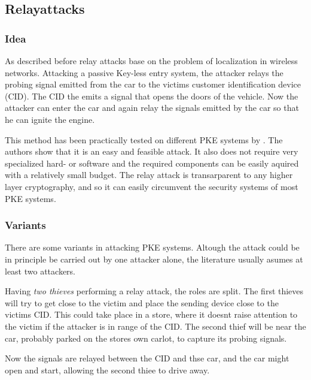 
\subsection{Relayattacks}
\label{sec:relayAttacks}
\subsubsection*{Idea}

	As described before relay attacks base on the problem of localization in
	wireless networks.
	Attacking a passive Key-less entry system,
	the attacker relays the probing signal emitted from the car to the victims
	customer identification device (CID).
	The CID the emits a signal that opens the doors of the vehicle.
	Now the attacker can enter the car and again relay the signals emitted by the
	car so that he can ignite the engine.
	
	This method has been practically tested on different PKE systems by \cite{relayAttacksFranc}. %
	The authors show that it is an easy and feasible attack.
	It also does not require very specialized hard- or software and
	the required components can be easily aquired with a relatively small budget.
	The relay attack is transarparent to any higher layer cryptography,	%
	and so it can easily circumvent the security systems of most PKE systems.

\subsubsection*{Variants}
	There are some variants in attacking PKE systems.
	Altough the attack could be in principle be carried out by one attacker alone,
	the literature usually asumes at least two attackers.


	\label{par:twoThieves}
	Having \textsl{two thieves} performing a relay attack,
	the roles are split.
	The first thieves will try to get close to the victim and place
	the sending device close to the victims CID.
	This could take place in a store,
	where it doesnt raise attention to the victim if the attacker
	is in range of the CID.
	The second thief will be near the car,
	probably parked on the stores own carlot,
	to capture its probing signals.

	Now the signals are relayed between the CID and thse car,
	and the car might open and start,
	allowing the second thiee to drive away.
	
